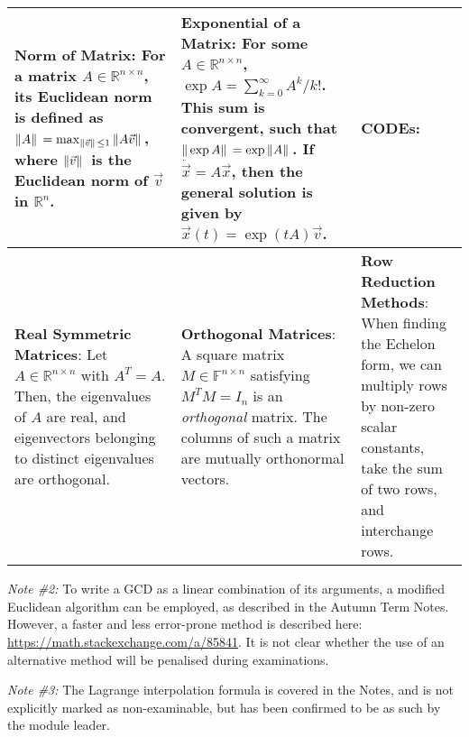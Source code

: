 \clearpage
\begin{tabular}{|m{.31\linewidth}|m{.31\linewidth}|m{.31\linewidth}|}
\hline

\textbf{Norm of Matrix}:
    For a matrix $ A \in \mathbb{R}^{n \times n} $, its Euclidean norm is
    defined as $ \|A\|\, = \max_{\|\vec{v}\|\, \leq 1} \|A \vec{v}\|\, $,
    where $ \|\vec{v}\|\, $ is the Euclidean norm of $ \vec{v} $ in $
    \mathbb{R}^n $. &

\textbf{Exponential of a Matrix}:
    For some $ A \in \mathbb{R}^{n \times n} $, $ \exp A = \sum_{k=0}^\infty
    A^k/k! $. This sum is convergent, such that $ \|\exp A\|\, = \exp \|A\|\,
    $. If $ \dot{\vec{x}} = A\vec{x} $, then the general solution is given by $
    \vec{x}(t) = \exp(tA)\vec{v} $. &

\textbf{CODEs}:
    \smash{$
        \ldots\vec{x}(t) = \mathconst{e}^{tA}\vec{v} = M
        \begin{pmatrix}
            \mathconst{e}^{\lambda_1 t} & 0 & \ldots \\
            0 & \mathconst{e}^{\lambda_2 t} & \ldots \\
            \ldots & \ldots & \mathconst{e}^{\lambda_n t}
        \end{pmatrix}
        M^{-1}\vec{v}
    $} \\

\hline

\textbf{Real Symmetric Matrices}:
    Let $ A \in \mathbb{R}^{n \times n} $ with $ A^T = A $. Then, the
    eigenvalues of $ A $ are real, and eigenvectors belonging to distinct
    eigenvalues are orthogonal. &

\textbf{Orthogonal Matrices}:
    A square matrix $ M \in \mathbb{F}^{n \times n} $ satisfying $ M^T M = I_n $
    is an \emph{orthogonal} matrix. The columns of such a matrix are mutually
    orthonormal vectors. &

\textbf{Row Reduction Methods}:
    When finding the Echelon form, we can multiply rows by non-zero scalar
    constants, take the sum of two rows, and interchange rows. \\

\hline
\end{tabular}

\vspace{1em}
\emph{Note \#2:} To write a GCD as a linear combination of its arguments, a
modified Euclidean algorithm can be employed, as described in the Autumn Term
Notes.  However, a faster and less error-prone method is described here:
\url{https://math.stackexchange.com/a/85841}. It is not clear whether the use of
an alternative method will be penalised during examinations.

\vspace{.5em}
\emph{Note \#3:} The Lagrange interpolation formula is covered in the Notes, and
is not explicitly marked as non-examinable, but has been confirmed to be as such
by the module leader.


